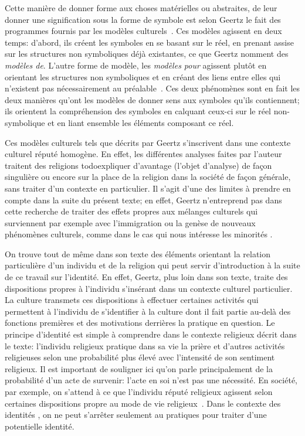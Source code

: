 Cette manière de donner forme aux choses matérielles ou abstraites, de leur donner une signification sous la forme de symbole est selon Geertz le fait des programmes fournis par les modèles culturels~\citep[25]{Geertz1972}. 
Ces modèles agissent en deux temps: d'abord, ils créent les symboles en se basant sur le réel, en prenant assise sur les structures non symboliques déjà existantes, ce que Geertz nomment des \emph{modèles de}. 
L'autre forme de modèle, les \emph{modèles pour} agissent plutôt en orientant les structures non symboliques et en créant des liens entre elles qui n'existent pas nécessairement au préalable~\citep[26--27]{Geertz1972}. 
Ces deux phénomènes sont en fait les deux manières qu'ont les modèles de donner sens aux symboles qu'ils contiennent; ils orientent la compréhension des symboles en calquant ceux-ci sur le réel non-symbolique et en liant ensemble les éléments composant ce réel.

Ces modèles culturels tels que décrits par Geertz s'inscrivent dans une contexte culturel réputé homogène. 
En effet, les différentes analyses faites par l'auteur traitent des religions todo{expliquer d'avantage} (l'objet d'analyse) de façon singulière ou encore sur la place de la religion dans la société de façon générale, sans traiter d'un contexte en particulier. 
Il s'agit d'une des limites à prendre en compte dans la suite du présent texte; en effet, Geertz n'entreprend pas dans cette recherche de traiter des effets propres aux mélanges culturels qui surviennent par exemple avec l'immigration ou la genèse de nouveaux phénomènes culturels, comme dans le cas qui nous intéresse les minorités \lgbt{}.

On trouve tout de même dans son texte des éléments orientant la relation particulière d'un individu et de la religion qui peut servir d'introduction à la suite de ce travail sur l'identité. 
En effet, Geertz, plus loin dans son texte, traite des dispositions propres à l'individu s'insérant dans un contexte culturel particulier. 
La culture transmets ces dispositions à effectuer certaines activités qui permettent à l'individu de s'identifier à la culture dont il fait partie au-delà des fonctions premières et des motivations derrières la pratique en question. 
Le principe d'identité est simple à comprendre dans le contexte religieux décrit dans le texte: l'individu religieux pratique dans sa vie la prière et d'autres activités religieuses selon une probabilité plus élevé avec l'intensité de son sentiment religieux. 
Il est important de souligner ici qu'on parle principalement de la probabilité d'un acte de survenir: l'acte en soi n'est pas une nécessité. 
En société, par exemple, on s'attend à ce que l'individu réputé religieux agissent selon certaines dispositions propre au mode de vie religieux~\citep[28--30]{Geertz1972}. 
Dans le contexte des identités \lgbt{}, on ne peut s'arrêter seulement au pratiques pour traiter d'une potentielle identité.


